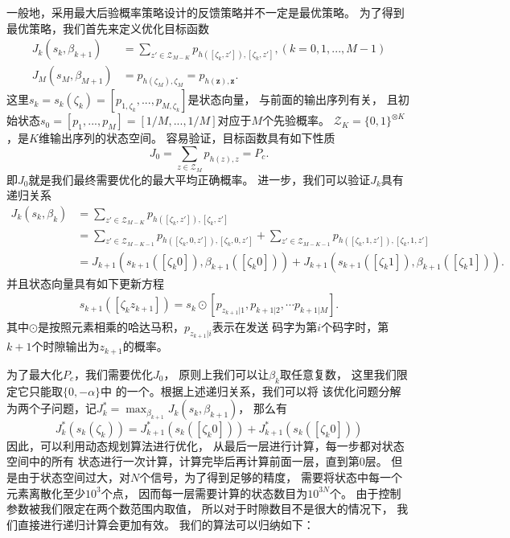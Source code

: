 一般地，采用最大后验概率策略设计的反馈策略并不一定是最优策略。
为了得到最优策略，我们首先来定义优化目标函数\cite{dalla2014adaptive}
\begin{equation}
\begin{split}
J_k(s_k, \beta_{k+1}) & = \sum_{z' \in \mathcal{Z}_{M-K}} p_{h([\zeta_{k}, z']), [\zeta_{k}, z']}, (k=0,1,...,M-1) \\
J_{M}(s_{M}, \beta_{M+1}) & =  p_{h(\zeta_M), \zeta_M} = p_{h(\bm{z}), \bm{z}}.
\end{split}
\label{eq:reward-to-go-function}
\end{equation}
这里$s_k =s_k(\zeta_{k}) = [p_{1,\zeta_{k}},...,p_{M,\zeta_{k}} ]$是状态向量，
与前面的输出序列有关，
且初始状态$s_0 = [p_1,  ..., p_M] = [1/M, ..., 1/M]$对应于$M$个先验概率。
$\mathcal{Z}_{K} = \{0, 1\}^{\otimes K}$，是$K$维输出序列的状态空间。
容易验证，目标函数具有如下性质
\begin{equation}
J_0 = \sum_{z\in \mathcal{Z}_M} p_{h(z),z} = P_c.
\end{equation}
即$J_0$就是我们最终需要优化的最大平均正确概率。
进一步，我们可以验证$J_k$具有递归关系
\begin{equation}
\begin{split}
J_k(s_k, \beta_k) & = \sum_{z' \in \mathcal{Z}_{M-K}} p_{h([\zeta_{k}, z']), [\zeta_{k}, z']} \\
                  & = \sum_{z' \in \mathcal{Z}_{M-K-1}} p_{h([\zeta_{k}, 0 , z']), [\zeta_{k}, 0 , z']} + \sum_{z' \in \mathcal{Z}_{M-K-1}} p_{h([\zeta_{k}, 1 , z']), [\zeta_{k}, 1 , z']} \\
                  & = J_{k+1}(s_{k+1}([\zeta_{k} 0]), \beta_{k+1}([\zeta_{k} 0])) + J_{k+1}(s_{k+1}([\zeta_{k} 1]), \beta_{k+1}([\zeta_{k} 1])).
\end{split}
\end{equation}
并且状态向量具有如下更新方程
\begin{equation}
\begin{split}
s_{k+1}([\zeta_{k} z_{k+1}]) = s_k \odot [p_{z_{k+1}|1}, p_{{k+1}|2}, \cdots p_{{k+1}|M}]. 
\end{split}
\label{eq:state-transform}
\end{equation}
其中$\odot$是按照元素相乘的哈达马积，$p_{z_{k+1}|i}$表示在发送
码字为第$i$个码字时，第$k+1$个时隙输出为$z_{k+1}$的概率。

为了最大化$P_c$，我们需要优化$J_0$，
原则上我们可以让$\beta_k$取任意复数，
这里我们限定它只能取$\{0, -\alpha\}$中
的一个。根据上述递归关系，我们可以将
该优化问题分解为两个子问题，记$J_k^* = \max_{\beta_{k+1}} J_k(s_k, \beta_{k+1})$，
那么有
\begin{equation}
J_k^*(s_k(\zeta_{k})) = J_{k+1}^*(s_k([\zeta_{k} 0])) + J_{k+1}^*(s_k([\zeta_{k} 0])) 
\end{equation}
因此，可以利用动态规划算法进行优化，
从最后一层进行计算，每一步都对状态空间中的所有
状态进行一次计算，计算完毕后再计算前面一层，直到第0层\cite{dalla2014adaptive}。
但是由于状态空间过大，对$N$个信号，为了得到足够的精度，
需要将状态中每一个元素离散化至少$10^3$个点，
因而每一层需要计算的状态数目为$10^{3N}$个。
由于控制参数被我们限定在两个数范围内取值，
所以对于时隙数目不是很大的情况下，
我们直接进行递归计算会更加有效。
我们的算法可以归纳如下：

